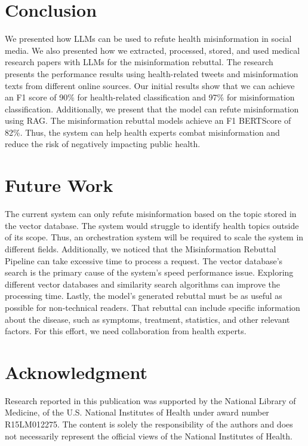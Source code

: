 \section{Conclusion}
We presented how LLMs can be used to refute health misinformation in social media. 
We also presented how we extracted, processed, stored, and used medical research papers with LLMs for the misinformation rebuttal. 
The research presents the performance results using health-related tweets and misinformation texts from different online sources. Our  initial results show that we can achieve an F1 score of 90\% for health-related classification and 97\% for misinformation classification. Additionally, we present that the model can refute misinformation using RAG. The misinformation rebuttal models achieve an F1 BERTScore of 82\%. Thus, the system can help health experts combat misinformation and reduce the risk of negatively impacting public health.

\section{Future Work}
The current system can only refute misinformation based on the topic stored in the vector database. The system would struggle to identify health topics outside of its scope. 
Thus, an orchestration system will be required to scale the system in different fields. Additionally, we noticed that the Misinformation Rebuttal Pipeline can take excessive time to process a request. 
The vector database's search is the primary cause of the system's speed performance issue. Exploring different vector databases and similarity search algorithms can improve the processing time.
Lastly, the model's generated rebuttal must be as useful as possible for non-technical readers. That rebuttal can include specific information about the disease, such as symptoms, treatment, statistics, and other relevant factors. For this effort, we need 
collaboration from health experts. 

\section{Acknowledgment}
Research reported in this publication was supported by the National Library
of Medicine, of the U.S. National Institutes of Health under award number
R15LM012275. The content is solely the responsibility of the authors and does
not necessarily represent the official views of the National Institutes of Health.

